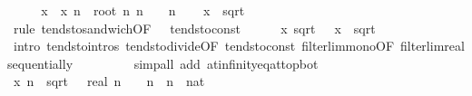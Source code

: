 \begin{isabellebody}
%
\isatagproof
{}\isamarkupfalse%
\ {\isacharminus}{\kern0pt}\isanewline
\ \ \isamarkupfalse%
\ x\ \ {\isachardoublequoteopen}x\ n\ {\isacharequal}{\kern0pt}\ root\ n\ n\ {\isacharminus}{\kern0pt}\ {}{\isachardoublequoteclose}\ \ n\isanewline
\ \ \isamarkupfalse%
\ {\isachardoublequoteopen}x\ {\isasymlonglonglongrightarrow}\ sqrt\ {}{\isachardoublequoteclose}\isanewline
\ \ \isamarkupfalse%
\ {\isacharparenleft}{\kern0pt}rule\ tendsto{\isacharunderscore}{\kern0pt}sandwich{\isacharbrackleft}{\kern0pt}OF\ {\isacharunderscore}{\kern0pt}\ {\isacharunderscore}{\kern0pt}\ tendsto{\isacharunderscore}{\kern0pt}const{\isacharbrackright}{\kern0pt}{\isacharparenright}{\kern0pt}\isanewline
\ \ \ \ \isamarkupfalse%
\ {\isachardoublequoteopen}{\isacharparenleft}{\kern0pt}{\isasymlambda}x{\isachardot}{\kern0pt}\ sqrt\ {\isacharparenleft}{\kern0pt}{}\ {\isacharslash}{\kern0pt}\ x{\isacharparenright}{\kern0pt}{\isacharparenright}{\kern0pt}\ {\isasymlonglonglongrightarrow}\ sqrt\ {}{\isachardoublequoteclose}\isanewline
\ \ \ \ \ \ \isamarkupfalse%
\ {\isacharparenleft}{\kern0pt}intro\ tendsto{\isacharunderscore}{\kern0pt}intros\ tendsto{\isacharunderscore}{\kern0pt}divide{\isacharunderscore}{\kern0pt}{}{\isacharbrackleft}{\kern0pt}OF\ tendsto{\isacharunderscore}{\kern0pt}const{\isacharbrackright}{\kern0pt}\ filterlim{\isacharunderscore}{\kern0pt}mono{\isacharbrackleft}{\kern0pt}OF\ filterlim{\isacharunderscore}{\kern0pt}real{\isacharunderscore}{\kern0pt}sequentially{\isacharbrackright}{\kern0pt}{\isacharparenright}{\kern0pt}\isanewline
\ \ \ \ \ \ \ \ \ {\isacharparenleft}{\kern0pt}simp{\isacharunderscore}{\kern0pt}all\ add{\isacharcolon}{\kern0pt}\ at{\isacharunderscore}{\kern0pt}infinity{\isacharunderscore}{\kern0pt}eq{\isacharunderscore}{\kern0pt}at{\isacharunderscore}{\kern0pt}top{\isacharunderscore}{\kern0pt}bot{\isacharparenright}{\kern0pt}\isanewline
\ \ \ \ \isamarkupfalse%
\ {\isachardoublequoteopen}x\ n\ {\isasymle}\ sqrt\ {\isacharparenleft}{\kern0pt}{}\ {\isacharslash}{\kern0pt}\ real\ n{\isacharparenright}{\kern0pt}{\isachardoublequoteclose}\ \ {\isachardoublequoteopen}{}\ {\isacharless}{\kern0pt}\ n{\isachardoublequoteclose}\ \ n\ {\isacharcolon}{\kern0pt}{\isacharcolon}{\kern0pt}\ nat\isanewline
\ \ \ \ \isamarkupfalse%
\ {\isacharminus}{\kern0pt}\isanewline
\ \ \ \ \ \ \isamarkupfalse%

\end{isabellebody}
